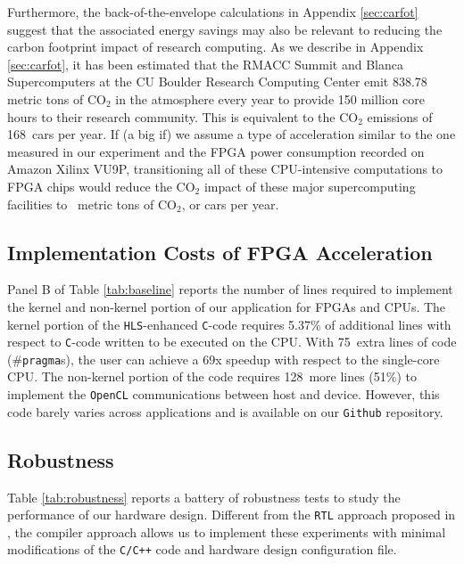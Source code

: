 \documentclass[12pt,american]{article}
\newcommand{\resultsfolder}{./results}
\newcommand{\SummitonFPGAtotmTonCOII}{}
\newcommand{\fpgacars}{}
\newcommand{\extraLinesKernel}{75}
\newcommand{\extraLinesKernelpercent}{5.37}
\newcommand{\extraLinesNonkernel}{128}
\newcommand{\extraLinesNonkernelpercent}{51}
\newcommand{\SummittotmTonCOII}{838.78}
\newcommand{\cpucarsnumber}{168}
\begin{document}
Furthermore, the back-of-the-envelope calculations in Appendix \ref{sec:carfot} suggest that the associated energy savings may also be relevant to reducing the carbon footprint impact of research computing. As we describe in Appendix \ref{sec:carfot}, it has been estimated that the RMACC Summit and Blanca Supercomputers at the CU Boulder Research Computing Center emit \SummittotmTonCOII\, metric tons of CO$_2$ in the atmosphere every year to provide 150 million core hours to their research community. This is equivalent to the CO$_2$ emissions of \cpucarsnumber\ cars per year. If (a big if) we assume a type of acceleration similar to the one measured in our experiment and the FPGA power consumption recorded on Amazon Xilinx VU9P, transitioning all of these CPU-intensive computations to FPGA chips would reduce the CO$_2$ impact of these major supercomputing facilities to \SummitonFPGAtotmTonCOII\, metric tons of CO$_2$, or \fpgacars cars per year. 

\subsection{Implementation Costs of FPGA Acceleration}\label{subsec:imp:cost}

Panel B of Table \ref{tab:baseline} reports the number of lines required to implement the kernel and non-kernel portion of our application for FPGAs and CPUs. The kernel portion of the \texttt{HLS}-enhanced \texttt{C}-code requires \extraLinesKernelpercent\% of additional lines with respect to \texttt{C}-code written to be executed on the CPU. With \extraLinesKernel\, extra lines of code (\#\texttt{pragma}s), the user can achieve a 69x speedup with respect to the single-core CPU. The non-kernel portion of the code requires \extraLinesNonkernel\ more lines (\extraLinesNonkernelpercent\%) to implement the \texttt{OpenCL} communications between host and device. However, this code barely varies across applications and is available on our \texttt{Github} repository.

\subsection{Robustness}\label{sec:rob}

Table \ref{tab:robustness} reports a battery of robustness tests to study the performance of our hardware design. Different from the \texttt{RTL} approach proposed in \citet{Peri2020}, the compiler approach allows us to implement these experiments with minimal modifications of the \texttt{C/C++} code and hardware design configuration file.
\end{document}
